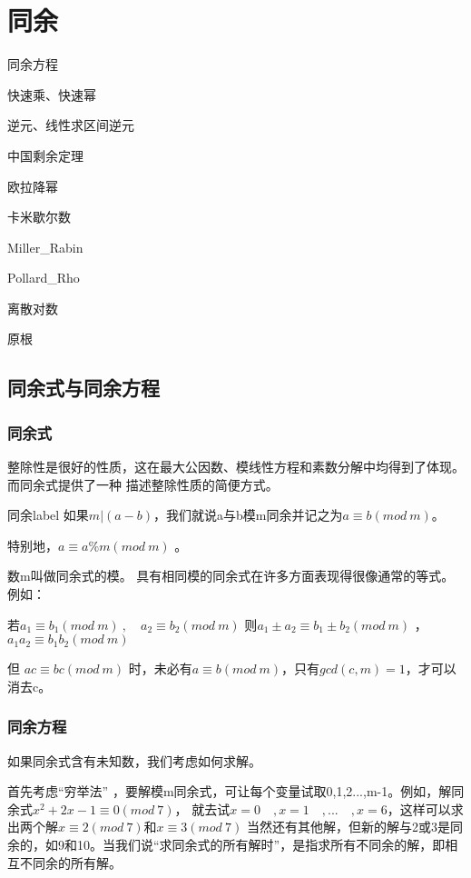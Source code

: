 \chapter{同余}

\begin{introduction}
\item 同余方程
\item 快速乘、快速幂
\item 逆元、线性求区间逆元
\item 中国剩余定理
\item 欧拉降幂
\item 卡米歇尔数
\item Miller\_Rabin
\item Pollard\_Rho
\item 离散对数
\item 原根
\end{introduction}


\section{同余式与同余方程}
\subsection{同余式}
整除性是很好的性质，这在最大公因数、模线性方程和素数分解中均得到了体现。而同余式提供了一种
描述整除性质的简便方式。

\begin{definition}{同余}{label}
	如果$m|(a-b)$，我们就说a与b模m同余并记之为$a\equiv b(mod\ m)$。
	
	特别地，$a\equiv a\%m(mod\ m)$ 。
\end{definition}

数m叫做同余式的模。 具有相同模的同余式在许多方面表现得很像通常的等式。例如：

若$a_1\equiv b_1(mod\ m) \ ,\quad a_2\equiv b_2(mod\ m)$     则$a_1\pm a_2\equiv b_1\pm b_2(mod \ m)$ ，$a_1a_2\equiv b_1b_2(mod \ m)$ 

{\heiti 但 $ac\equiv bc(mod \ m)$ 时，未必有$a\equiv b(mod \ m)$，只有$gcd(c,m)=1$，才可以消去c。}


\subsection{同余方程}
如果同余式含有未知数，我们考虑如何求解。

首先考虑“穷举法” ，要解模m同余式，可让每个变量试取0,1,2...,m-1。例如，解同余式$x^2+2x-1\equiv 0(mod\ 7)$，
就去试$x=0\quad, x=1\quad,...\quad,x=6$，这样可以求出两个解$x\equiv 2(mod\ 7)$和$x\equiv 3(mod\ 7)$ 当然还有其他解，但新的解与2或3是同余的，如9和10。当我们说“求同余式的所有解时”，是指求所有不同余的解，即相互不同余的所有解。

